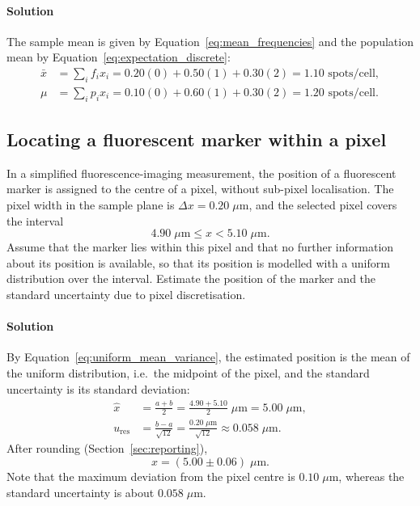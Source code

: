 \paragraph{Solution} The sample mean is given by Equation~\eqref{eq:mean_frequencies} and the population mean by Equation~\eqref{eq:expectation_discrete}:
\begin{align*}
\bar{x} &= \sum_i f_ix_i = 0.20(0) + 0.50(1) + 0.30(2) = 1.10\text{ spots/cell}, \\
\mu &= \sum_i p_ix_i = 0.10(0) + 0.60(1) + 0.30(2) = 1.20\text{ spots/cell}.
\end{align*}

\subsection{Locating a fluorescent marker within a pixel}
\label{ex:pixel_localisation}

In a simplified fluorescence-imaging measurement, the position of a fluorescent marker is assigned to the centre of a pixel, without sub-pixel localisation. The pixel width in the sample plane is $\Delta x = 0.20\;\mu\text{m}$, and the selected pixel covers the interval
\begin{equation*}
4.90\;\mu\text{m} \le x < 5.10\;\mu\text{m}.
\end{equation*}
Assume that the marker lies within this pixel and that no further information about its position is available, so that its position is modelled with a uniform distribution over the interval. Estimate the position of the marker and the standard uncertainty due to pixel discretisation.

\paragraph{Solution} By Equation~\eqref{eq:uniform_mean_variance}, the estimated position is the mean of the uniform distribution, i.e.\ the midpoint of the pixel, and the standard uncertainty is its standard deviation:
\begin{align*}
\hat{x} &= \frac{a + b}{2} = \frac{4.90 + 5.10}{2}\;\mu\text{m} = 5.00\;\mu\text{m}, \\[1ex]
u_{\text{res}} &= \frac{b - a}{\sqrt{12}} = \frac{0.20\;\mu\text{m}}{\sqrt{12}} \approx 0.058\;\mu\text{m}.
\end{align*}
After rounding (Section~\ref{sec:reporting}),
\begin{equation*}
x = (5.00 \pm 0.06)\;\mu\text{m}.
\end{equation*}
Note that the maximum deviation from the pixel centre is $0.10\;\mu\text{m}$, whereas the standard uncertainty is about $0.058\;\mu\text{m}$.

